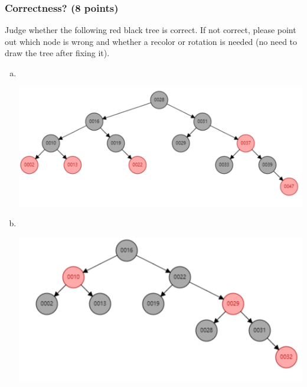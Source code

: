 \documentclass[11pt]{exam}
\begin{document}
\subsubsection{Correctness? (8 points)}
Judge whether the following red black tree is correct. If not correct, please point out which node is wrong and whether a recolor or rotation is needed (no need to draw the tree after fixing it).
\begin{enumerate}[a)]
    \item \quad\\
    \begin{center}
        \includegraphics[scale=0.3]{rb_tree_1.png}
    \end{center}
    \begin{solution}
    \end{solution}
    \item \quad\\
    \begin{center}
        \includegraphics[scale=0.3]{rb_tree_2.png}
    \end{center}
    \begin{solution}
    \end{solution}
\end{enumerate}
\end{document}
